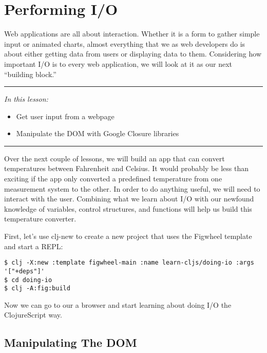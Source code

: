 \documentclass[10pt,twoside,openright]{memoir}
\begin{document}
\chapter{Performing I/O}

Web applications are all about interaction. Whether it is a form to
gather simple input or animated charts, almost everything that we as web
developers do is about either getting data from users or displaying data
to them. Considering how important I/O is to every web application, we
will look at it as our next ``building block.''

\begin{center}\rule{0.5\linewidth}{0.5pt}\end{center}

\emph{In this lesson:}

\begin{itemize}
\tightlist
\item
  Get user input from a webpage
\item
  Manipulate the DOM with Google Closure libraries
\end{itemize}

\begin{center}\rule{0.5\linewidth}{0.5pt}\end{center}

Over the next couple of lessons, we will build an app that can convert
temperatures between Fahrenheit and Celsius. It would probably be less
than exciting if the app only converted a predefined temperature from
one measurement system to the other. In order to do anything useful, we
will need to interact with the user. Combining what we learn about I/O
with our newfound knowledge of variables, control structures, and
functions will help us build this temperature converter.

First, let's use clj-new to create a new project that uses the Figwheel
template and start a REPL:

\begin{verbatim}
$ clj -X:new :template figwheel-main :name learn-cljs/doing-io :args '["+deps"]'
$ cd doing-io
$ clj -A:fig:build
\end{verbatim}

Now we can go to our a browser and start learning about doing I/O the
ClojureScript way.

\section{Manipulating The DOM}
\end{document}
